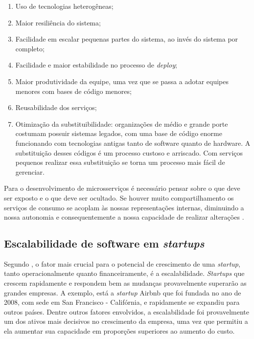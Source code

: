 \begin{enumerate}
    \item{Uso de tecnologias heterogêneas;}
    \item{Maior resiliência do sistema;}
    \item{Facilidade em escalar pequenas partes do sistema, ao invés do sistema por
    completo;}
    \item{Facilidade e maior estabilidade no processo de \textit{deploy};}
    \item{Maior produtividade da equipe, uma vez que se passa a adotar equipes
    menores com bases de código menores;}
    \item{Reusabilidade dos serviços;}
    \item{Otimização da substituibilidade: organizações de médio e grande porte costumam
    possuir sistemas legados, com uma base de código enorme funcionando com tecnologias
    antigas tanto de software quanto de hardware. A substituição desses códigos é um
    processo custoso e arriscado. Com serviços pequenos realizar essa substituição
    se torna um processo mais fácil de gerenciar.}
\end{enumerate}

Para o desenvolvimento de microsserviços é necessário pensar sobre o que deve ser
exposto e o que deve ser ocultado. Se houver muito compartilhamento os serviços de
consumo se acoplam às nossas representações internas, diminuindo a nossa autonomia
e consequentemente a nossa capacidade de realizar alterações \cite{Newman2015}.

\subsection{Escalabilidade de software em \textit{startups}}

Segundo , o fator mais crucial para o potencial
de crescimento de uma \textit{startup}, tanto operacionalmente quanto financeiramente,
é a escalabilidade. \textit{Startups} que crescem rapidamente e respondem bem as
mudanças provavelmente superarão as grandes empresas. A exemplo, está a \textit{startup}
Airbnb que foi fundada no ano de 2008, com sede em San Francisco - Califórnia, e
rapidamente se expandiu para outros países. Dentre outros fatores envolvidos, a
escalabilidade foi provavelmente um dos ativos mais decisivos no crescimento da
empresa, uma vez que permitiu a ela aumentar sua capacidade em proporções superiores
ao aumento do custo.

